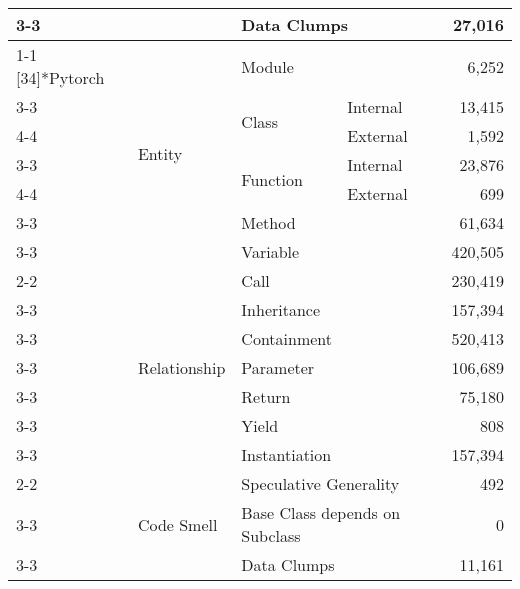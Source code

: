 \begin{tabularx}{\linewidth}{p{1.8cm}p{1.8cm}Xp{0.8cm}r}
\cmidrule{3-3}\cmidrule{4-4}\cmidrule{5-5}
 &  & \multicolumn{2}{l}{Data Clumps} & 27,016 \\
\cmidrule{1-1}\cmidrule{2-2}\cmidrule{3-3}\cmidrule{4-4}\cmidrule{5-5}
\multirow{17}[34]{*}{Pytorch} & \multirow{7}[14]{*}{Entity} & \multicolumn{2}{l}{\textsf{Module}} & 6,252 \\
\cmidrule{3-3}\cmidrule{4-4}\cmidrule{5-5}
 &  & \multirow{2}[4]{*}{\textsf{Class}} & Internal & 13,415 \\
\cmidrule{4-4}\cmidrule{5-5}
 &  &  & External & 1,592 \\
\cmidrule{3-3}\cmidrule{4-4}\cmidrule{5-5}
 &  & \multirow{2}[4]{*}{\textsf{Function}} & Internal & 23,876 \\
\cmidrule{4-4}\cmidrule{5-5}
 &  &  & External & 699 \\
\cmidrule{3-3}\cmidrule{4-4}\cmidrule{5-5}
 &  & \multicolumn{2}{l}{\textsf{Method}} & 61,634 \\
\cmidrule{3-3}\cmidrule{4-4}\cmidrule{5-5}
 &  & \multicolumn{2}{l}{\textsf{Variable}} & 420,505 \\
\cmidrule{2-2}\cmidrule{3-3}\cmidrule{4-4}\cmidrule{5-5}
 & \multirow{7}[14]{*}{Relationship} & \multicolumn{2}{l}{Call} & 230,419 \\
\cmidrule{3-3}\cmidrule{4-4}\cmidrule{5-5}
 &  & \multicolumn{2}{l}{Inheritance} & 157,394 \\
\cmidrule{3-3}\cmidrule{4-4}\cmidrule{5-5}
 &  & \multicolumn{2}{l}{Containment} & 520,413 \\
\cmidrule{3-3}\cmidrule{4-4}\cmidrule{5-5}
 &  & \multicolumn{2}{l}{Parameter} & 106,689 \\
\cmidrule{3-3}\cmidrule{4-4}\cmidrule{5-5}
 &  & \multicolumn{2}{l}{Return} & 75,180 \\
\cmidrule{3-3}\cmidrule{4-4}\cmidrule{5-5}
 &  & \multicolumn{2}{l}{Yield} & 808 \\
\cmidrule{3-3}\cmidrule{4-4}\cmidrule{5-5}
 &  & \multicolumn{2}{l}{Instantiation} & 157,394 \\
\cmidrule{2-2}\cmidrule{3-3}\cmidrule{4-4}\cmidrule{5-5}
 & \multirow{3}[6]{*}{Code Smell} & \multicolumn{2}{l}{\begin{minipage}[t]{2.2cm}Speculative \newline Generality\end{minipage}} & 492 \\
\cmidrule{3-3}\cmidrule{4-4}\cmidrule{5-5}
 &  & \multicolumn{2}{l}{\begin{minipage}[t]{2.2cm}Base \textsf{Class} depends on Subclass\end{minipage}} & 0 \\
\cmidrule{3-3}\cmidrule{4-4}\cmidrule{5-5}
 &  & \multicolumn{2}{l}{Data Clumps} & 11,161 \\
\bottomrule
\end{tabularx}

